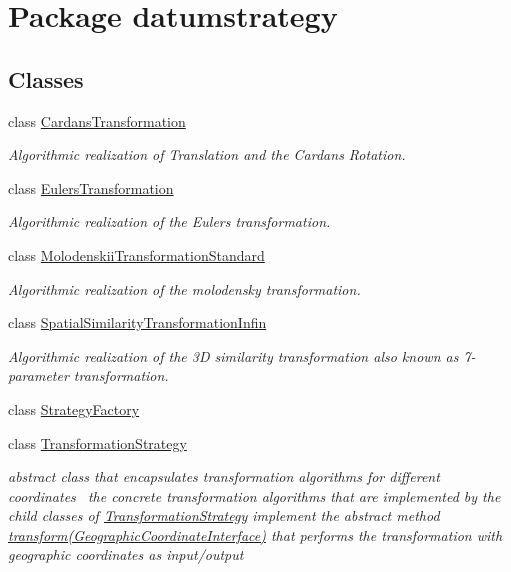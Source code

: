 \hypertarget{namespacedatumstrategy}{}\section{Package datumstrategy}
\label{namespacedatumstrategy}
\subsection*{Classes}
\begin{DoxyCompactItemize}
\item 
class \hyperlink{classdatumstrategy_1_1_cardans_transformation}{Cardans\+Transformation}
\begin{DoxyCompactList}\small\item\em Algorithmic realization of Translation and the Cardan\textquotesingle{}s Rotation. \end{DoxyCompactList}\item 
class \hyperlink{classdatumstrategy_1_1_eulers_transformation}{Eulers\+Transformation}
\begin{DoxyCompactList}\small\item\em Algorithmic realization of the Euler\textquotesingle{}s transformation. \end{DoxyCompactList}\item 
class \hyperlink{classdatumstrategy_1_1_molodenskii_transformation_standard}{Molodenskii\+Transformation\+Standard}
\begin{DoxyCompactList}\small\item\em Algorithmic realization of the molodensky transformation. \end{DoxyCompactList}\item 
class \hyperlink{classdatumstrategy_1_1_spatial_similarity_transformation_infin}{Spatial\+Similarity\+Transformation\+Infin}
\begin{DoxyCompactList}\small\item\em Algorithmic realization of the 3D similarity transformation also known as 7-\/parameter transformation. \end{DoxyCompactList}\item 
class \hyperlink{classdatumstrategy_1_1_strategy_factory}{Strategy\+Factory}
\item 
class \hyperlink{classdatumstrategy_1_1_transformation_strategy}{Transformation\+Strategy}
\begin{DoxyCompactList}\small\item\em abstract class that encapsulates transformation algorithms for different coordinates~\newline
 the concrete transformation algorithms that are implemented by the child classes of \hyperlink{classdatumstrategy_1_1_transformation_strategy}{Transformation\+Strategy} implement the abstract method \hyperlink{classdatumstrategy_1_1_transformation_strategy_a0fd1d6fbba01e5222360740e34eae786}{transform(\+Geographic\+Coordinate\+Interface)} that performs the transformation with geographic coordinates as input/output \end{DoxyCompactList}\end{DoxyCompactItemize}
